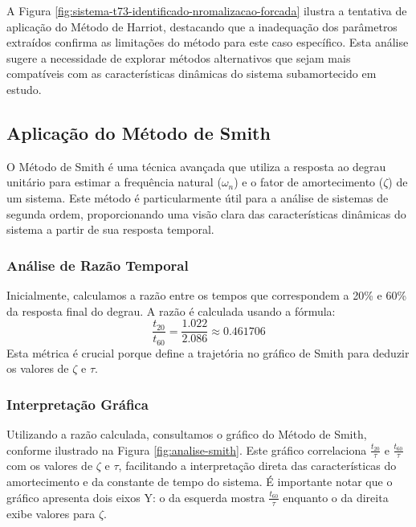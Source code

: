 A Figura \ref{fig:sistema-t73-identificado-nromalizacao-forcada} ilustra a tentativa de aplicação do Método de Harriot, destacando que a inadequação dos parâmetros extraídos confirma as limitações do método para este caso específico. Esta análise sugere a necessidade de explorar métodos alternativos que sejam mais compatíveis com as características dinâmicas do sistema subamortecido em estudo.

\subsection{Aplicação do Método de Smith}

O Método de Smith é uma técnica avançada que utiliza a resposta ao degrau unitário para estimar a frequência natural (\(\omega_n\)) e o fator de amortecimento (\(\zeta\)) de um sistema. Este método é particularmente útil para a análise de sistemas de segunda ordem, proporcionando uma visão clara das características dinâmicas do sistema a partir de sua resposta temporal.

\subsubsection{Análise de Razão Temporal}

Inicialmente, calculamos a razão entre os tempos que correspondem a 20\% e 60\% da resposta final do degrau. A razão é calculada usando a fórmula:
\[
    \frac{t_{20}}{t_{60}} = \frac{1.022}{2.086} \approx 0.461706
\]
Esta métrica é crucial porque define a trajetória no gráfico de Smith para deduzir os valores de \(\zeta\) e \(\tau\).

\subsubsection{Interpretação Gráfica}

Utilizando a razão calculada, consultamos o gráfico do Método de Smith, conforme ilustrado na Figura \ref{fig:analise-smith}. Este gráfico correlaciona \(\frac{t_{20}}{\tau}\) e \(\frac{t_{60}}{\tau}\) com os valores de \(\zeta\) e \(\tau\), facilitando a interpretação direta das características do amortecimento e da constante de tempo do sistema. É importante notar que o gráfico apresenta dois eixos Y: o da esquerda mostra \(\frac{t_{60}}{\tau}\) enquanto o da direita exibe valores para \(\zeta\).

